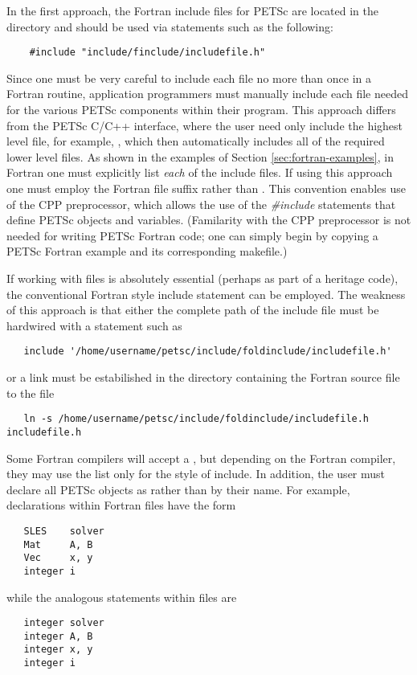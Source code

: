 In the first  approach, 
the Fortran include files for PETSc are located in the directory 
 and should be used via statements 
such as the following:
\begin{verbatim}
    #include "include/finclude/includefile.h"
\end{verbatim}
Since one must be very careful to include each file no more than once
in a Fortran routine, application programmers must manually include
each file needed for the various PETSc components within their
program.  This approach differs from the PETSc C/C++ interface, where
the user need only include the highest level file, for example, , which then automatically includes all of the required lower
level files.  As shown in the examples of Section
\ref{sec:fortran-examples}, in Fortran one must explicitly list {\em
each} of the include files. If using this approach one must employ
the Fortran file suffix 
rather than .  This convention enables use of the CPP
preprocessor, which allows the use of the {\em \#include} statements
that define PETSc objects and variables. (Familarity with the CPP
preprocessor is not needed for writing PETSc Fortran code; one can simply
begin by copying a PETSc Fortran example and its corresponding
makefile.)  

\medskip

If working with  files is absolutely essential (perhaps as
part of a heritage code), the conventional Fortran style include
statement can be employed.  The weakness of this approach is that either the
complete path of the include file must be hardwired with a statement such as
\begin{verbatim}
   include '/home/username/petsc/include/foldinclude/includefile.h'
\end{verbatim}
or a link must be estabilished in the directory containing the Fortran source
file to the file
\begin{verbatim}
   ln -s /home/username/petsc/include/foldinclude/includefile.h includefile.h
\end{verbatim}
Some Fortran compilers will accept a , but depending on the
Fortran compiler, they may use the  list only for the 
style of include.
In addition, the user must declare all PETSc objects as  
rather than by their name. For example, declarations within Fortran
 files have the form
\begin{verbatim}
   SLES    solver
   Mat     A, B
   Vec     x, y
   integer i
\end{verbatim}
while the analogous statements within  files are
\begin{verbatim}
   integer solver
   integer A, B
   integer x, y
   integer i
\end{verbatim}

